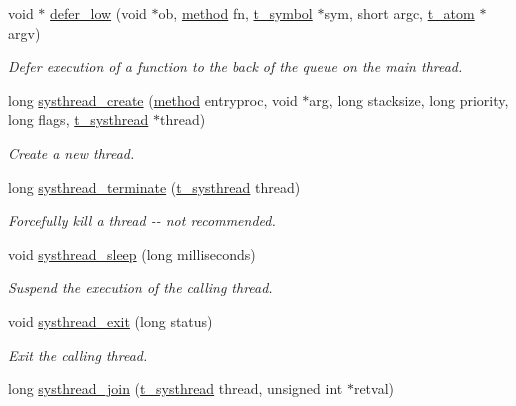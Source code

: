 \begin{DoxyCompactItemize}
void $\ast$ \hyperlink{group__threading_ga486daa40ddb16f70b663615695d18315}{defer\_\-low} (void $\ast$ob, \hyperlink{group__datatypes_gac26ba0a173b50597f5738132e059b42d}{method} fn, \hyperlink{structt__symbol}{t\_\-symbol} $\ast$sym, short argc, \hyperlink{structt__atom}{t\_\-atom} $\ast$argv)
\begin{DoxyCompactList}\small\item\em Defer execution of a function to the back of the queue on the main thread. \item\end{DoxyCompactList}\item 
long \hyperlink{group__threading_ga7217fa33811a5ed35b970f504b4e4a79}{systhread\_\-create} (\hyperlink{group__datatypes_gac26ba0a173b50597f5738132e059b42d}{method} entryproc, void $\ast$arg, long stacksize, long priority, long flags, \hyperlink{group__threading_gaaf0068b8e9ac28430873484727029315}{t\_\-systhread} $\ast$thread)
\begin{DoxyCompactList}\small\item\em Create a new thread. \item\end{DoxyCompactList}\item 
long \hyperlink{group__threading_gaacc57aeddc69c01e7562397bdf6f12f5}{systhread\_\-terminate} (\hyperlink{group__threading_gaaf0068b8e9ac28430873484727029315}{t\_\-systhread} thread)
\begin{DoxyCompactList}\small\item\em Forcefully kill a thread -\/-\/ not recommended. \item\end{DoxyCompactList}\item 
void \hyperlink{group__threading_gad1ca1694ee14824a56916d8f67d7966b}{systhread\_\-sleep} (long milliseconds)
\begin{DoxyCompactList}\small\item\em Suspend the execution of the calling thread. \item\end{DoxyCompactList}\item 
void \hyperlink{group__threading_gad448ff5be27ef8233162a0e24751786f}{systhread\_\-exit} (long status)
\begin{DoxyCompactList}\small\item\em Exit the calling thread. \item\end{DoxyCompactList}\item 
long \hyperlink{group__threading_gaac24a9db0d7af2343501a4e762d2ce85}{systhread\_\-join} (\hyperlink{group__threading_gaaf0068b8e9ac28430873484727029315}{t\_\-systhread} thread, unsigned int $\ast$retval)

\end{DoxyCompactItemize}
